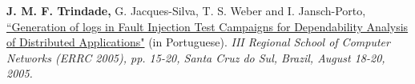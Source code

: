 \documentclass[line,margin]{res}
\begin{document}
\begin{resume}
\textbf{J. M. F. Trindade,} G. Jacques-Silva, T. S. Weber and I. Jansch-Porto, \href{http://joanatrindade.wikidot.com/local--files/curriculum/errc2005.pdf}{``Generation of logs in Fault Injection Test Campaigns for Dependability Analysis of Distributed Applications"} (in Portuguese). \textit{III Regional School of Computer Networks (ERRC 2005), pp. 15-20, Santa Cruz do Sul, Brazil, August 18-20, 2005.}




\end{resume}
\end{document}
